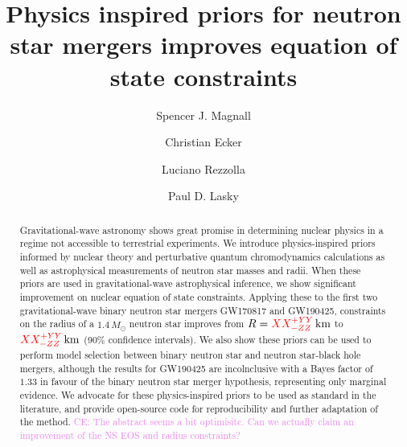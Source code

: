 \documentclass[twocolumn]{aastex631}
\newcommand{\red}[1]{\textcolor{red}{#1}}
\newcommand{\CE}[1]{\textcolor{violet}{CE: #1}}
\begin{document}
	
\title{Physics inspired priors for neutron star mergers improves equation of state constraints}

\author[0009-0000-7037-1809]{Spencer J. Magnall}


\author[0000-0002-8669-4300]{Christian Ecker}

\author[0000-0002-1330-7103]{Luciano Rezzolla}


\author[0000-0003-3763-1386]{Paul D. Lasky}
	
\begin{abstract}
 Gravitational-wave astronomy shows great promise in determining nuclear physics in a regime not accessible to terrestrial experiments. 
 We introduce physics-inspired priors informed by nuclear theory and perturbative quantum chromodynamics calculations as well as astrophysical measurements of neutron star masses and radii.
 When these priors are used in gravitational-wave astrophysical inference, we show significant improvement on nuclear equation of state constraints. 
 Applying these to the first two gravitational-wave binary neutron star mergers GW170817 and GW190425, constraints on the radius of a $1.4\,M_\odot$ neutron star improves from $R=\red{XX^{+YY}_{-ZZ}}\,{\rm km}$ to $\red{XX^{+YY}_{-ZZ}}\,{\rm km}$ (90\% confidence intervals).
 We also show these priors can be used to perform model selection between binary neutron star and neutron star-black hole mergers, although the results for GW190425 are incolnclusive with a Bayes factor of $1.33$ in favour of the binary neutron star merger hypothesis, representing only marginal evidence.
 We advocate for these physics-inspired priors to be used as standard in the literature, and provide open-source code for reproducibility and further adaptation of the method.
 \CE{The abstract seems a bit optimisitc. Can we actually claim an improvement of the NS EOS and radius constraints?}
\end{abstract}
	
\end{document}
